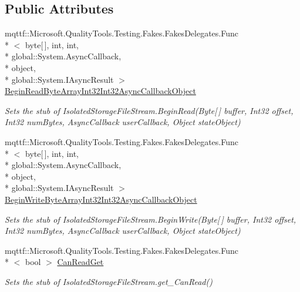 \subsection*{Public Attributes}
\begin{DoxyCompactItemize}
\item 
mqttf\-::\-Microsoft.\-Quality\-Tools.\-Testing.\-Fakes.\-Fakes\-Delegates.\-Func\\*
$<$ byte\mbox{[}$\,$\mbox{]}, int, int, \\*
global\-::\-System.\-Async\-Callback, \\*
object, \\*
global\-::\-System.\-I\-Async\-Result $>$ \hyperlink{class_system_1_1_i_o_1_1_isolated_storage_1_1_fakes_1_1_stub_isolated_storage_file_stream_ac0c6e51edc7146c106ff3565d055a3e4}{Begin\-Read\-Byte\-Array\-Int32\-Int32\-Async\-Callback\-Object}
\begin{DoxyCompactList}\small\item\em Sets the stub of Isolated\-Storage\-File\-Stream.\-Begin\-Read(\-Byte\mbox{[}$\,$\mbox{]} buffer, Int32 offset, Int32 num\-Bytes, Async\-Callback user\-Callback, Object state\-Object)\end{DoxyCompactList}\item 
mqttf\-::\-Microsoft.\-Quality\-Tools.\-Testing.\-Fakes.\-Fakes\-Delegates.\-Func\\*
$<$ byte\mbox{[}$\,$\mbox{]}, int, int, \\*
global\-::\-System.\-Async\-Callback, \\*
object, \\*
global\-::\-System.\-I\-Async\-Result $>$ \hyperlink{class_system_1_1_i_o_1_1_isolated_storage_1_1_fakes_1_1_stub_isolated_storage_file_stream_aafecb76050bc5538aae772569aebc831}{Begin\-Write\-Byte\-Array\-Int32\-Int32\-Async\-Callback\-Object}
\begin{DoxyCompactList}\small\item\em Sets the stub of Isolated\-Storage\-File\-Stream.\-Begin\-Write(\-Byte\mbox{[}$\,$\mbox{]} buffer, Int32 offset, Int32 num\-Bytes, Async\-Callback user\-Callback, Object state\-Object)\end{DoxyCompactList}\item 
mqttf\-::\-Microsoft.\-Quality\-Tools.\-Testing.\-Fakes.\-Fakes\-Delegates.\-Func\\*
$<$ bool $>$ \hyperlink{class_system_1_1_i_o_1_1_isolated_storage_1_1_fakes_1_1_stub_isolated_storage_file_stream_a6a4b90f83548120b09b1d57e6f43cfb6}{Can\-Read\-Get}
\begin{DoxyCompactList}\small\item\em Sets the stub of Isolated\-Storage\-File\-Stream.\-get\-\_\-\-Can\-Read()\end{DoxyCompactList}\item 

\end{DoxyCompactItemize}
